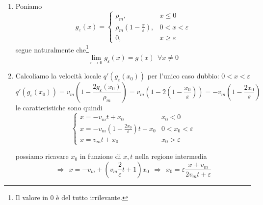 \documentclass[10pt,a4paper,twoside,openright]{book}
\begin{document}

\begin{enumerate}
	\item Poniamo
	      \begin{equation*}
	      	g_{\varepsilon }( x) =
	      	\begin{cases}
	      		\rho _{m} ,                                       & x\leqslant 0           \\
	      		\rho _{m}\left( 1-\frac{x}{\varepsilon }\right) , & 0< x< \varepsilon      \\
	      		0,                                                & x\geqslant \varepsilon 
	      	\end{cases}
	      \end{equation*}segue naturalmente che\footnote{Il valore in $0$ è del tutto irrilevante.}
	      \begin{equation*}
	      	\lim\limits _{\varepsilon \rightarrow 0} g_{\varepsilon }( x) =g( x) \ \ \forall x\neq 0
	      \end{equation*}
	\item Calcoliamo la velocità locale $q'( g_{\varepsilon }( x_{0}))$ per l'unico caso dubbio: $0< x< \varepsilon $
	      \begin{equation*}
	      	q'( g_{\varepsilon }( x_{0})) =v_{m}\left( 1-\frac{2g_{\varepsilon }( x_{0})}{\rho _{m}}\right) =v_{m}\left( 1-2\left( 1-\frac{x_{0}}{\varepsilon }\right)\right) =-v_{m}\left( 1-\frac{2x_{0}}{\varepsilon }\right)
	      \end{equation*}le caratteristiche sono quindi
	      \begin{equation*}
	      	\begin{cases}
	      		x=-v_{m} t+x_{0}                                            & x_{0} < 0              \\
	      		x=-v_{m}\left( 1-\frac{2x_{0}}{\varepsilon }\right) t+x_{0} & 0< x_{0} < \varepsilon \\
	      		x=v_{m} t+x_{0}                                             & x_{0}  >\varepsilon    
	      	\end{cases}
	      \end{equation*}
	      
	      possiamo ricavare $x_{0}$ in funzione di $x,t$ nella regione intermedia
	      \begin{equation*}
	      	\Rightarrow \ \ x=-v_{m} +\left( v_{m}\frac{2}{\varepsilon } t+1\right) x_{0} \ \ \Rightarrow \ \ x_{0} =\varepsilon \frac{x+v_{m}}{2v_{m} t+\varepsilon }
	      \end{equation*}
	      

\end{enumerate}
\end{document}
